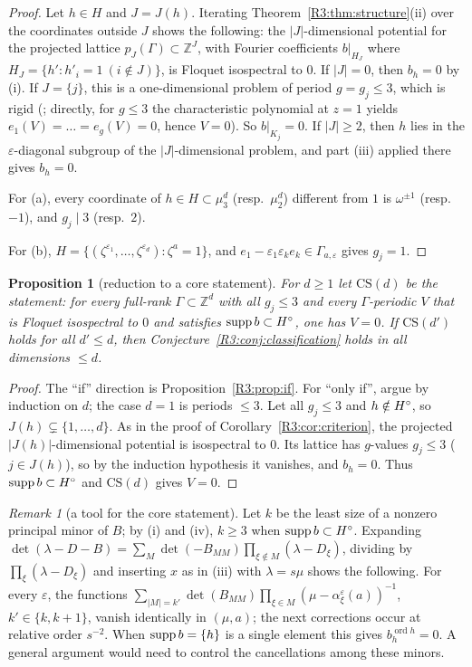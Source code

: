 \documentclass[11pt]{amsart}
\newtheorem{proposition}[theorem]{Proposition}
\theoremstyle{definition}
\theoremstyle{remark}
\newtheorem{remark}[theorem]{Remark}
\providecommand{\Z}{\mathbb Z}
\begin{document}
\begin{proof}
Let $h\in H$ and $J=J(h)$. Iterating Theorem~\ref{R3:thm:structure}(ii) over the
coordinates outside $J$ shows the following: the $|J|$-dimensional potential for
the projected lattice $p_J(\Gamma)\subset\Z^J$, with Fourier coefficients
$b|_{H_J}$ where $H_J=\{h':h'_i=1\ (i\notin J)\}$, is Floquet isospectral to $0$.
If $|J|=0$, then $b_h=0$ by (i). If $J=\{j\}$, this is a one-dimensional problem
of period $g=g_j\le3$, which is rigid (\cite[Theorem~C]{R3-CFK}; directly, for
$g\le3$ the characteristic polynomial at $z=1$ yields $e_1(V)=\dots=e_g(V)=0$,
hence $V=0$). So $b|_{K_j}=0$. If $|J|\ge2$, then $h$
lies in the $\varepsilon$-diagonal subgroup of the $|J|$-dimensional problem, and
part (iii) applied there gives $b_h=0$.

For (a), every coordinate of $h\in H\subset\mu_3^d$ (resp.\ $\mu_2^d$) different
from $1$ is $\omega^{\pm1}$ (resp.\ $-1$), and $g_j\mid3$ (resp.\ $2$).

For (b), $H=\{(\zeta^{\varepsilon_1},\dots,\zeta^{\varepsilon_d}):\zeta^a=1\}$, and
$e_1-\varepsilon_1\varepsilon_ke_k\in\Gamma_{a,\varepsilon}$ gives $g_j=1$.
\end{proof}

\begin{proposition}[reduction to a core statement]\label{R3:prop:reduction}
For $d\ge1$ let $\mathrm{CS}(d)$ be the statement: \emph{for every full-rank
$\Gamma\subset\Z^d$ with all $g_j\le3$ and every $\Gamma$-periodic $V$ that is Floquet
isospectral to $0$ and satisfies $\operatorname{supp} b\subset H^{\circ}$, one has $V=0$.} If
$\mathrm{CS}(d')$ holds for all $d'\le d$, then
Conjecture~\ref{R3:conj:classification} holds in all dimensions $\le d$.
\end{proposition}

\begin{proof}
The ``if'' direction is Proposition~\ref{R3:prop:if}. For ``only if'', argue by
induction on $d$; the case $d=1$ is periods $\le3$. Let all $g_j\le3$ and
$h\notin H^{\circ}$, so $J(h)\subsetneq\{1,\dots,d\}$. As in the proof of
Corollary~\ref{R3:cor:criterion}, the projected $|J(h)|$-dimensional potential is
isospectral to $0$. Its lattice has $g$-values $g_j\le3$ ($j\in J(h)$), so by the
induction hypothesis it vanishes, and $b_h=0$. Thus $\operatorname{supp} b\subset H^{\circ}$ and
$\mathrm{CS}(d)$ gives $V=0$.
\end{proof}

\begin{remark}[a tool for the core statement]\label{R3:rem:minors}
Let $k$ be the least size of a nonzero principal minor of $B$; by (i) and (iv),
$k\ge3$ when $\operatorname{supp} b\subset H^{\circ}$. Expanding
$\det(\lambda-D-B)=\sum_{M}\det(-B_{MM})\prod_{\xi\notin M}(\lambda-D_\xi)$,
dividing by $\prod_\xi(\lambda-D_\xi)$ and inserting $x$ as in (iii) with
$\lambda=s\mu$ shows the following. For every $\varepsilon$, the functions
$\sum_{|M|=k'}\det(B_{MM})\prod_{\xi\in M}(\mu-\alpha^\varepsilon_\xi(a))^{-1}$,
$k'\in\{k,k+1\}$, vanish identically in $(\mu,a)$; the next corrections occur at
relative order $s^{-2}$. When $\operatorname{supp} b=\{h\}$ is a single element this gives
$b_h^{\operatorname{ord}h}=0$. A general argument would need to control the
cancellations among these minors.
\end{remark}
\end{document}
